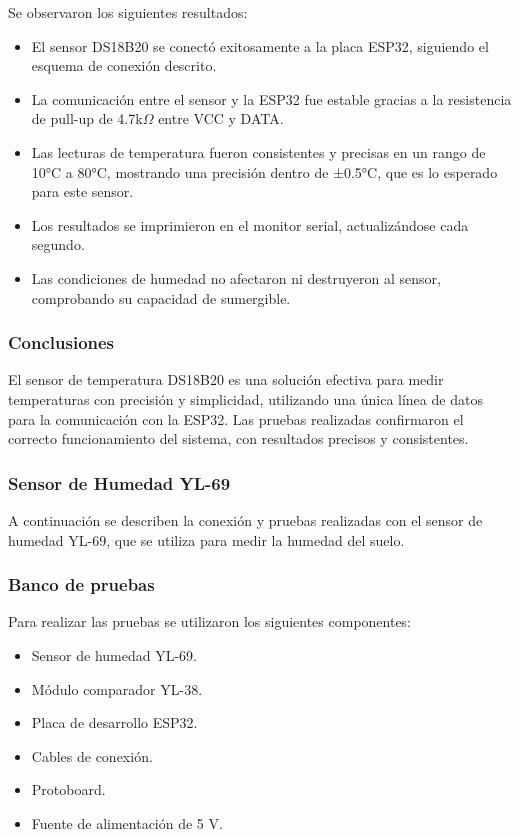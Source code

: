Se observaron los siguientes resultados:
\begin{itemize}
    \item El sensor DS18B20 se conectó exitosamente a la placa ESP32, siguiendo el esquema de conexión descrito.
    \item La comunicación entre el sensor y la ESP32 fue estable gracias a la resistencia de pull-up de 4.7k$\Omega$ entre VCC y DATA.
    \item Las lecturas de temperatura fueron consistentes y precisas en un rango de 10°C a 80°C, mostrando una precisión dentro de ±0.5°C, que es lo esperado para este sensor.
    \item Los resultados se imprimieron en el monitor serial, actualizándose cada segundo.
    \item Las condiciones de humedad no afectaron ni destruyeron al sensor, comprobando su capacidad de sumergible.
\end{itemize}

\subsubsection{Conclusiones}
El sensor de temperatura DS18B20 es una solución efectiva para medir temperaturas con precisión y simplicidad, utilizando una única línea de datos para la comunicación con la ESP32. Las pruebas realizadas confirmaron el correcto funcionamiento del sistema, con resultados precisos y consistentes.


\subsubsection{Sensor de Humedad YL-69}
A continuación se describen la conexión y pruebas realizadas con el sensor de humedad YL-69, que se utiliza para medir la humedad del suelo.

\subsubsection{Banco de pruebas}
Para realizar las pruebas se utilizaron los siguientes componentes:
\begin{itemize}
    \item Sensor de humedad YL-69.
    \item Módulo comparador YL-38.
    \item Placa de desarrollo ESP32.
    \item Cables de conexión.
    \item Protoboard.
    \item Fuente de alimentación de 5 V.
\end{itemize}

